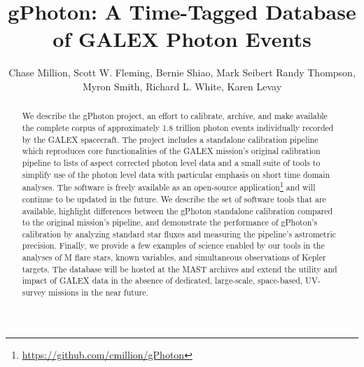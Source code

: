 \documentclass[preprint]{aastex}
\begin{document}
\title{gPhoton: A Time-Tagged Database of GALEX Photon Events}

\author{
Chase Million,
Scott W. Fleming,
Bernie Shiao,
Mark Seibert
Randy Thompson,
Myron Smith,
Richard L. White,
Karen Levay}



\begin{abstract}
We describe the gPhoton project, an effort to calibrate, archive, and make available the complete corpus of approximately 1.8 trillion photon events individually recorded by the GALEX spacecraft. The project includes a standalone calibration pipeline which reproduces core functionalities of the GALEX mission's original calibration pipeline to lists of aspect corrected photon level data and a small suite of tools to simplify use of the photon level data with particular emphasis on short time domain analyses.  The software is freely available as an open-source application\footnote{\url{https://github.com/cmillion/gPhoton}} and will continue to be updated in the future. We describe the set of software tools that are available, highlight differences between the gPhoton standalone calibration compared to the original mission's pipeline, and demonstrate the performance of gPhoton's calibration by analyzing standard star fluxes and measuring the pipeline's astrometric precision. Finally, we provide a few examples of science enabled by our tools in the analyses of M flare stars, known variables, and simultaneous observations of Kepler targets. The database will be hosted at the MAST archives and extend the utility and impact of GALEX data in the absence of dedicated, large-scale, space-based, UV-survey missions in the near future.
\end{abstract}
\end{document}
